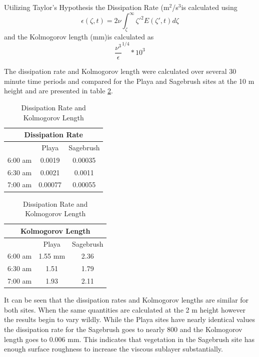 \documentclass[]{article}
\begin{document}
Utilizing Taylor's Hypothesis the Dissipation Rate (m$^2$/s$^3$is calculated using 
\begin{equation} \label{eq:diss}
\epsilon (\zeta ,t) = 2\nu \int_{\zeta}^{\infty} \zeta '^2E(\zeta ',t)d\zeta 
\end{equation}
and the Kolmogorov length (mm)is calculated as 
\begin{equation} \label{eq:kolm_length}
\frac{\nu^3}{\epsilon}^{1/4}*10^3
\end{equation}

The dissipation rate and Kolmogorov length were calculated over several 30 minute time periods and compared for the Playa and Sagebrush sites at the 10 m height and are presented in table \ref{tbl:diss}. 
\begin{table}[h] \label{tbl:diss}
\begin{minipage}[b]{0.45\linewidth}
\centering
\begin{tabular}{|c||c|c|}
	\hline
	\multicolumn{3}{|c|}{Dissipation Rate} \\
	\hline
	& Playa & Sagebrush \\
	\hline
	6:00 am & 0.0019 & 0.00035 \\
	6:30 am & 0.0021 & 0.0011 \\
	7:00 am & 0.00077 & 0.00055 \\
	\hline
\end{tabular}
\caption{Dissipation Rate and Kolmogorov Length}

\end{minipage}%
\begin{minipage}[b]{0.45\linewidth}
\centering
\begin{tabular}{|c||c|c|}
	\hline
	\multicolumn{3}{|c|}{Kolmogorov Length} \\
	\hline
	& Playa & Sagebrush \\
	\hline
	6:00 am & 1.55 mm & 2.36 \\
	6:30 am & 1.51 & 1.79 \\
	7:00 am & 1.93 & 2.11 \\
	\hline
\end{tabular}
\end{minipage}%
\end{table}
It can be seen that the dissipation rates and Kolmogorov lengths are similar for both sites. When the same quantities are calculated at the 2 m height however the results begin to vary wildly. While the Playa sites have nearly identical values the dissipation rate for the Sagebrush goes to nearly 800 and the Kolmogorov length goes to 0.006 mm. This indicates that vegetation in the Sagebrush site has enough surface roughness to increase the viscous sublayer substantially. 
\end{document}
